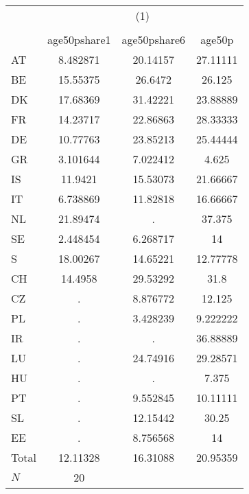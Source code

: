 {
\def\sym#1{\ifmmode^{#1}\else\(^{#1}\)\fi}
\begin{tabular}{l*{1}{ccc}}
\hline\hline
            &\multicolumn{3}{c}{(1)}               \\
            &\multicolumn{3}{c}{}                  \\
            &age50pshare1&age50pshare6&      age50p\\
\hline
AT          &    8.482871&    20.14157&    27.11111\\
BE          &    15.55375&     26.6472&      26.125\\
DK          &    17.68369&    31.42221&    23.88889\\
FR          &    14.23717&    22.86863&    28.33333\\
DE          &    10.77763&    23.85213&    25.44444\\
GR          &    3.101644&    7.022412&       4.625\\
IS          &     11.9421&    15.53073&    21.66667\\
IT          &    6.738869&    11.82818&    16.66667\\
NL          &    21.89474&           .&      37.375\\
SE          &    2.448454&    6.268717&          14\\
S           &    18.00267&    14.65221&    12.77778\\
CH          &     14.4958&    29.53292&        31.8\\
CZ          &           .&    8.876772&      12.125\\
PL          &           .&    3.428239&    9.222222\\
IR          &           .&           .&    36.88889\\
LU          &           .&    24.74916&    29.28571\\
HU          &           .&           .&       7.375\\
PT          &           .&    9.552845&    10.11111\\
SL          &           .&    12.15442&       30.25\\
EE          &           .&    8.756568&          14\\
Total       &    12.11328&    16.31088&    20.95359\\
\hline
\(N\)       &          20&            &            \\
\hline\hline
\end{tabular}
}
